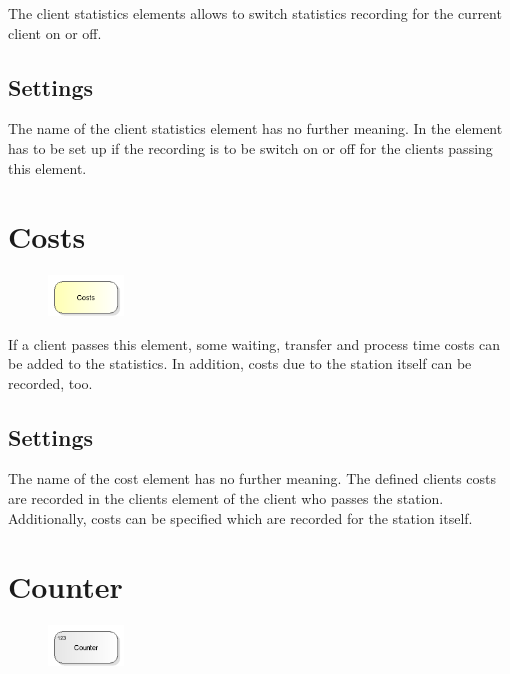 The client statistics elements allows to switch statistics recording
for the current client on or off.

\subsection*{Settings}

The name of the client statistics element has no further meaning.
In the element has to be set up if the recording is to be switch on or off
for the clients passing this element.


\section{Costs}
\label{ref:ModelElementCosts}

\begin{figure}
\vspace{-22pt}
\includegraphics[width=2cm]{imageModelElementCosts.png}
\vspace{-22pt}
\end{figure}

If a client passes this element, some waiting, transfer and process time costs can be added to the
statistics. In addition, costs due to the station itself can be recorded, too.

\subsection*{Settings}

The name of the cost element has no further meaning. The defined clients costs are recorded in the clients element
of the client who passes the station. Additionally, costs can be specified which are recorded for the station itself.


\section{Counter}
\label{ref:ModelElementCounter}

\begin{figure}
\vspace{-22pt}
\includegraphics[width=2cm]{imageModelElementCounter.png}
\vspace{-22pt}
\end{figure}

